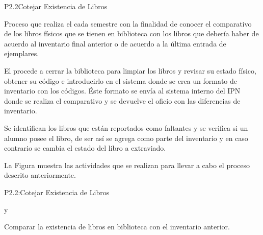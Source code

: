 
\begin{Proceso}{P2.2}{Cotejar Existencia de Libros} {
  

  Proceso que realiza el  cada semestre con la finalidad de conocer el comparativo de los libros físicos que se tienen en biblioteca con los libros que debería haber de acuerdo al inventario final anterior o de acuerdo a la última entrada de ejemplares.
  
  El  procede a cerrar la biblioteca para limpiar los libros y revisar su estado físico, obtener su código e introducirlo en el sistema donde se crea un formato de inventario con los códigos.  Éste formato se envía al sistema interno del IPN donde se realiza el comparativo y se devuelve el oficio con las diferencias de inventario.
  
  Se identifican los libros que están reportados como faltantes y se verifica si un alumno posee el libro, de ser así se agrega como parte del inventario y en caso contrario se cambia el estado del libro a extraviado.
  
  \noindent La Figura  muestra las actividades que se realizan para llevar a cabo el proceso descrito anteriormente.


} {P2.2:Cotejar Existencia de Libros}

   { %
     y 
  }

   { %
    Comparar la existencia de libros en biblioteca con el inventario anterior.
  }


\end{Proceso}
